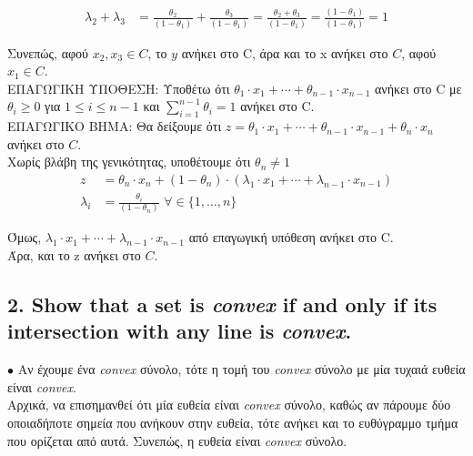 \documentclass[12pt]{article}
\newcommand{\margin}{\hspace{4pt}}
\begin{document}
\begin{align*}
    λ_2 + λ_3 & = \frac{θ_2}{(1 - θ_1)} + \frac{θ_3}{(1 - θ_1)} = \frac{θ_2 + θ_3}{(1 - θ_1)} = \frac{(1 - θ_1)}{(1 - θ_1)} = 1
\end{align*}

Συνεπώς, αφού $x_2, x_3 \in C$, το $y$ ανήκει στο C, άρα και το x ανήκει στο $C$, αφού $x_1 \in C$. \\

ΕΠΑΓΩΓΙΚΗ ΥΠΟΘΕΣΗ: Υποθέτω ότι $θ_1 \cdot x_1 + \dotsb + θ_{n-1} \cdot x_{n-1}$ ανήκει στο C με $θ_i \geq 0$ για $1 \leq i \leq n-1$ και $ \sum_{i=1}^{n-1}θ_i = 1 $ ανήκει στο C. \\

ΕΠΑΓΩΓΙΚΟ ΒΗΜΑ: Θα δείξουμε ότι $z = θ_1 \cdot x_1 + \dotsb + θ_{n-1} \cdot x_{n-1} + θ_n \cdot x_n$ ανήκει στο $C$. \\

Χωρίς βλάβη της γενικότητας, υποθέτουμε ότι $θ_n \neq 1$\\

\begin{align*}
    z & = θ_n \cdot x_n + (1 - θ_n) \cdot (λ_1 \cdot x_1 + \dotsb + λ_{n-1} \cdot x_{n-1}) \\
    λ_i & = \frac{θ_i}{(1 - θ_n)} \margin \forall \in \lbrace 1, \dotsc, n \rbrace
\end{align*}

Όμως, $λ_1 \cdot x_1 + \dotsb + λ_{n-1} \cdot x_{n-1}$ από επαγωγική υπόθεση ανήκει στο C. \\

Άρα, και το z ανήκει στο $C$.

\vspace{2in}

\pagebreak

\subsection*{2. Show that a set is \textit{convex} if and only if its intersection with any line is \textit{convex}.}

$\bullet$ Αν έχουμε ένα \textit{convex} σύνολο, τότε η τομή του \textit{convex} σύνολο με μία τυχαιά ευθεία είναι \textit{convex}. \\

Αρχικά, να επισημανθεί ότι μία ευθεία είναι \textit{convex} σύνολο,
καθώς αν πάρουμε δύο οποιαδήποτε σημεία που ανήκουν στην ευθεία,
τότε ανήκει και το ευθύγραμμο τμήμα που ορίζεται από αυτά.
Συνεπώς, η ευθεία είναι \textit{convex} σύνολο. \\
\end{document}
